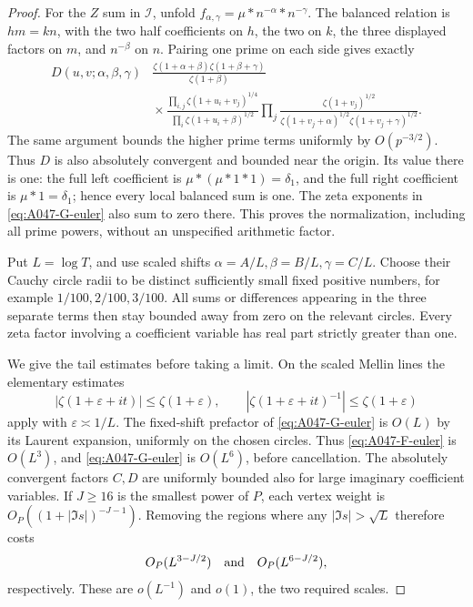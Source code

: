 \begin{proof}
For the \(Z\) sum in \(\mathcal I\), unfold
\(f_{\alpha,\gamma}=\mu*n^{-\alpha}*n^{-\gamma}\).
The balanced relation is \(hm=kn\), with the two half
coefficients on \(h\), the two on \(k\), the three
displayed factors on \(m\), and \(n^{-\beta}\) on \(n\).
Pairing one prime on each side gives exactly
\begin{align}
 D(u,v;\alpha,\beta,\gamma)&
 \frac{\zeta(1+\alpha+\beta)\zeta(1+\beta+\gamma)}
      {\zeta(1+\beta)}\nonumber\\
 &{}\times
 \frac{\prod_{i,j}\zeta(1+u_i+v_j)^{1/4}}
      {\prod_i\zeta(1+u_i+\beta)^{1/2}}
 \prod_j
 \frac{\zeta(1+v_j)^{1/2}}
      {\zeta(1+v_j+\alpha)^{1/2}
                         \zeta(1+v_j+\gamma)^{1/2}} .
 \label{eq:A047-G-euler}
\end{align}
The same argument bounds the higher prime terms uniformly
by \(O(p^{-3/2})\).  Thus \(D\) is also absolutely convergent
and bounded near the origin.  Its value there is one:
the full left coefficient is
\(\mu*(\mu*1*1)=\delta_1\), and the full right coefficient
is \(\mu*1=\delta_1\); hence every local balanced sum is one.
The zeta exponents in \eqref{eq:A047-G-euler} also sum to
zero there.  This proves the normalization, including all
prime powers, without an unspecified arithmetic factor.

Put \(L=\log T\), and use scaled shifts
\(\alpha=A/L,\beta=B/L,\gamma=C/L\).  Choose their Cauchy
circle radii to be distinct sufficiently small fixed
positive numbers, for example \(1/100,2/100,3/100\).
All sums or differences appearing in the three separate
terms then stay bounded away from zero on the relevant
circles.  Every zeta factor involving a coefficient variable
has real part strictly greater than one.

We give the tail estimates before taking a limit.
On the scaled Mellin lines the elementary estimates
\[
 |\zeta(1+\varepsilon+it)|\le\zeta(1+\varepsilon),
 \qquad
 |\zeta(1+\varepsilon+it)^{-1}|
                                  \le\zeta(1+\varepsilon)
\]
apply with \(\varepsilon\asymp1/L\).  The fixed-shift
prefactor of \eqref{eq:A047-G-euler} is \(O(L)\) by its
Laurent expansion, uniformly on the chosen circles.
Thus \eqref{eq:A047-F-euler} is \(O(L^3)\), and
\eqref{eq:A047-G-euler} is \(O(L^6)\), before cancellation.
The absolutely convergent factors \(C,D\) are uniformly
bounded also for large imaginary coefficient variables.
If \(J\ge16\) is the smallest power of \(P\), each vertex
weight is \(O_P((1+|\Im s|)^{-J-1})\).  Removing the
regions where any \(|\Im s|>\sqrt L\) therefore costs
\[
                   O_P(L^{3-J/2})
       \quad\hbox{and}\quad O_P(L^{6-J/2}),
\]
respectively.  These are \(o(L^{-1})\) and \(o(1)\),
the two required scales.


\end{proof}
